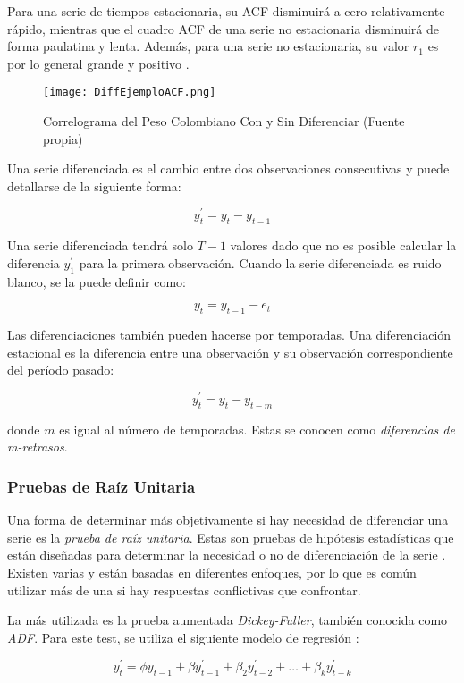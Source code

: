 Para una serie de tiempos estacionaria, su ACF disminuirá a cero relativamente rápido, mientras que el cuadro ACF de una serie no estacionaria disminuirá de forma paulatina y lenta. Además, para una serie no estacionaria, su valor $r_1$ es por lo general grande y positivo \cite{hyndman}.

\begin{figure}[h!]
    \centering
    \texttt{[image: DiffEjemploACF.png]}
    \caption{Correlograma del Peso Colombiano Con y Sin Diferenciar (Fuente propia)}
\end{figure}

Una serie diferenciada es el cambio entre dos observaciones consecutivas y puede detallarse de la siguiente forma:

\[ y_{t}^{\prime} = y_{t} - y_{t-1} \]

Una serie diferenciada tendrá solo $T-1$ valores dado que no es posible calcular la diferencia $y_{1}^{\prime}$ para la primera observación. Cuando la serie diferenciada es ruido blanco, se la puede definir como:

\[ y_{t} = y_{t-1} - e_{t} \]

Las diferenciaciones también pueden hacerse por temporadas. Una diferenciación estacional es la diferencia entre una observación y su observación correspondiente del período pasado:

\[ y_{t}^{\prime} = y_{t} - y_{t-m} \]

donde $m$ es igual al número de temporadas. Estas se conocen como \emph{diferencias de m-retrasos}.

\subsubsection{Pruebas de Raíz Unitaria}
Una forma de determinar más objetivamente si hay necesidad de diferenciar una serie es la \emph{prueba de raíz unitaria}. Estas son pruebas de hipótesis estadísticas que están diseñadas para determinar la necesidad o no de diferenciación de la serie \cite{hyndman}. Existen varias y están basadas en diferentes enfoques, por lo que es común utilizar más de una si hay respuestas conflictivas que confrontar. 

La más utilizada es la prueba aumentada \emph{Dickey-Fuller}, también conocida como \emph{ADF}. Para este test, se utiliza el siguiente modelo de regresión \cite{dickeyfuller}:

\[ y_{t}^{\prime} = \phi y_{t-1} + \beta y_{t-1}^{\prime} + \beta_{2} y_{t-2}^{\prime} + \ldots + \beta_{k} y_{t-k}^{\prime} \]

